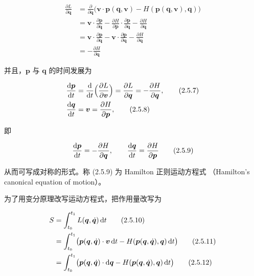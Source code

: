 \begin{align}
  \frac{\partial L}{\partial\bm{q}}
    &= \frac{\partial}{\partial\bm{q}}
       \bigl(\bm{v}\cdot\bm{p}(\bm{q},\bm{v})
         - H(\bm{p}(\bm{q},\bm{v}),\bm{q})\bigr) \tag{2.5.3}\\
  &= \bm{v}\cdot\frac{\partial\bm{p}}{\partial\bm{q}}
     - \frac{\partial H}{\partial\bm{p}}\cdot
       \frac{\partial\bm{p}}{\partial\bm{q}}
     - \frac{\partial H}{\partial\bm{q}} \tag{2.5.4}\\
  &= \bm{v}\cdot\frac{\partial\bm{p}}{\partial\bm{q}}
     - \bm{v}\cdot\frac{\partial\bm{p}}{\partial\bm{q}}
     - \frac{\partial H}{\partial\bm{q}} \tag{2.5.5}\\
  &= -\frac{\partial H}{\partial\bm{q}} \tag{2.5.6}
\end{align}

并且，$\bm{p}$ 与 $\bm{q}$ 的时间发展为

\begin{align}
  \frac{\mathrm{d}\bm{p}}{\mathrm{d} t}
    &= \frac{\mathrm{d}}{\mathrm{d} t}\Bigl(\frac{\partial L}{\partial\bm{v}}\Bigr)
     = \frac{\partial L}{\partial\bm{q}}
     = -\frac{\partial H}{\partial\bm{q}}, \tag{2.5.7}\\
  \frac{\mathrm{d}\bm{q}}{\mathrm{d} t}
    &= \bm{v} = \frac{\partial H}{\partial\bm{p}}, \tag{2.5.8}
\end{align}

即

\begin{equation}
  \frac{\mathrm{d}\bm{p}}{\mathrm{d} t} = -\frac{\partial H}{\partial\bm{q}},\qquad
  \frac{\mathrm{d}\bm{q}}{\mathrm{d} t} = \frac{\partial H}{\partial\bm{p}}
  \tag{2.5.9}
\end{equation}

从而可写成对称的形式。称 (2.5.9) 为 Hamilton 正则运动方程式
（Hamilton's canonical equation of motion）。

为了用变分原理改写运动方程式，把作用量改写为

\begin{align}
  S &= \int_{t_0}^{t_1} L(\bm{q},\dot{\bm{q}})\,\mathrm{d} t \tag{2.5.10}\\
  &= \int_{t_0}^{t_1}
     \bigl(\bm{p}(\bm{q},\dot{\bm{q}})\cdot\bm{v}\,\mathrm{d} t
       - H(\bm{p}(\bm{q},\dot{\bm{q}}),\bm{q})\,\mathrm{d} t\bigr)
     \tag{2.5.11}\\
  &= \int_{t_0}^{t_1}
     \bigl(\bm{p}(\bm{q},\dot{\bm{q}})\cdot\mathrm{d}\bm{q}
       - H(\bm{p}(\bm{q},\dot{\bm{q}}),\bm{q})\,\mathrm{d} t\bigr)
     \tag{2.5.12}
\end{align}

